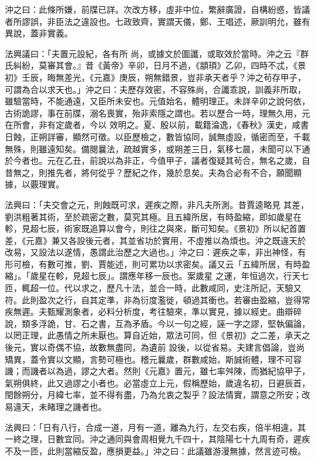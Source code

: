\begin{pinyinscope}
 沖之曰：此條所嫌，前牒已詳。次改方移，虛非中位，繁辭廣證，自構紛惑，皆議者所謬誤，非臣法之違設也。七政致齊，實謂天儀，鄭、王唱述，厥訓明允，雖有異說，蓋非實義。



 法興議曰：「夫置元設紀，各有所
 尚，或據文於圖讖，或取效於當時。沖之云『群氏糾紛，莫審其會。』昔《黃帝》辛卯，日月不過，《顓頊》乙卯，四時不忒，《景初》壬辰，晦無差光，《元嘉》庚辰，朔無錯景，豈非承天者乎？沖之茍存甲子，可謂為合以求天也。」沖之曰：夫歷存效密，不容殊尚，合讖乖說，訓義非所取，雖驗當時，不能通遠，又臣所未安也。元值始名，體明理正。未詳辛卯之說何依，古術詭謬，事在前牒，溺名喪實，殆非索隱之謂也。若以歷合一時，理無久用，元在所會，非有定歲者，今以
 效明之。夏、殷以前，載籍淪逸，《春秋》漢史，咸書日蝕，正朔詳審，顯然可徵。以臣歷檢之，數皆協同，誠無虛設，循密而至，千載無殊，則雖遠知矣。備閱曩法，疏越實多，或朔差三日，氣移七晨，未聞可以下通於今者也。元在乙丑，前說以為非正，今值甲子，議者復疑其茍合，無名之歲，自昔無之，則推先者，將何從乎？歷紀之作，幾於息矣。夫為合必有不合，願聞顯據，以覈理實。



 法興曰：「夫交會之元，則蝕既可求，遲疾之際，非凡夫所測。昔賈逵略見
 其差，劉洪粗著其術，至於疏密之數，莫究其極。且五緯所居，有時盈縮，即如歲星在軫，見超七辰，術家既追算以會今，則往之與來，斷可知矣。《景初》所以紀首置差，《元嘉》兼又各設後元者，其並省功於實用，不虛推以為煩也。沖之既違天於改易，又設法以遂情，愚謂此治歷之大過也。」沖之曰：遲疾之率，非出神怪，有形可檢，有數可推，劉、賈能述，則可累功以求密矣。議又云「五緯所居，有時盈縮」。「歲星在軫，見超七辰」。謂應年移一辰也。案歲星
 之運，年恒過次，行天七匝，輒超一位。代以求之，歷凡十法，並合一時，此數咸同，史注所記，天驗又符。此則盈次之行，自其定準，非為衍度濫徙，頓過其衝也。若審由盈縮，豈得常疾無遲。夫甄耀測象者，必料分析度，考往驗來，準以實見，據以經史。曲辯碎說，類多浮詭，甘、石之書，互為矛盾。今以一句之經，誣一字之謬，堅執偏論，以罔正理，此愚情之所未厭也。算自近始，眾法可同，但《景初》之二差，承天之後元，實以奇偶不協，故數無盡同，為遺前
 設後，以從省易。夫建言倡論，豈尚矯異，蓋令實以文顯，言勢可極也。稽元曩歲，群數咸始，斯誠術體，理不可容譏；而譏者以為過，謬之大者。然則《元嘉》置元，雖七率舛陳，而猶紀協甲子，氣朔俱終，此又過謬之小者也。必當虛立上元，假稱歷始，歲違名初，日避辰首，閏餘朔分，月緯七率，並不得有盡，乃為允衷之製乎？設法情實，謂意之所安；改易違天，未睹理之譏者也。



 法興曰：「日有八行，合成一道，月有一道，離為九行，左交右疾，倍半相違，其
 一終之理，日數宜同。沖之通同與會周相覺九千四十，其陰陽七十九周有奇，遲疾不及一匝，此則當縮反盈，應損更益。」沖之曰：此議雖游漫無據，然言迹可檢。




\end{pinyinscope}
